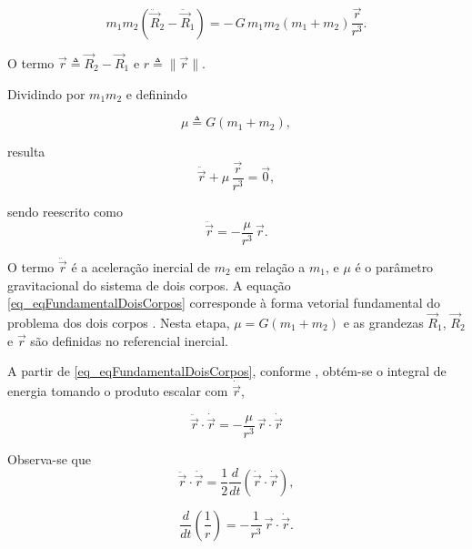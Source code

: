 \begin{equation}
m_1 m_2\left(\ddot{\vec R}_2-\ddot{\vec R}_1\right)
=
-\,G\,m_1 m_2\left(m_1+m_2\right)\frac{\vec r}{r^3}.
\end{equation}

O termo $\vec r\triangleq \vec R_2-\vec R_1$ e $r\triangleq\|\vec r\|$.

Dividindo por $m_1 m_2$ e definindo

\begin{equation}
\mu \triangleq G(m_1+m_2),
\end{equation}

resulta
\begin{equation}
\label{eq_eqFundamentalDoisCorpos1}
\ddot{\vec{r}} + \mu\,\frac{\vec{r}}{r^3} = \vec 0,
\end{equation}

sendo reescrito como
\begin{equation}
\label{eq_eqFundamentalDoisCorpos}
\ddot{\vec r} = -\frac{\mu}{r^3}\,\vec r.
\end{equation}

O termo $\ddot{\vec r}$ é a aceleração inercial de $m_2$ em relação a $m_1$, e $\mu$ é o parâmetro gravitacional do sistema de dois corpos.
A equação \eqref{eq_eqFundamentalDoisCorpos} corresponde à forma vetorial fundamental do problema dos dois corpos \cite{wie2008space}.
Nesta etapa, $\mu=G(m_1+m_2)$ e as grandezas $\vec R_1$, $\vec R_2$ e $\vec r$ são definidas no referencial inercial.

A partir de \eqref{eq_eqFundamentalDoisCorpos}, conforme \cite{wie2008space}, obtém-se o integral de energia tomando o produto escalar com $\dot{\vec r}$,

\begin{equation}
\ddot{\vec r}\cdot \dot{\vec r}
=
-\frac{\mu}{r^3}\,\vec r\cdot \dot{\vec r}
\label{eq_energia_dot_1}
\end{equation}

Observa-se que
\begin{equation}
\ddot{\vec r}\cdot \dot{\vec r}
=
\frac{1}{2}\frac{d}{dt}\!\left(\dot{\vec r}\cdot \dot{\vec r}\right),
\label{eq_identidade_ddotr_dotr}
\end{equation}

\begin{equation}
\frac{d}{dt}\!\left(\frac{1}{r}\right)
=
-\frac{1}{r^3}\,\vec r\cdot \dot{\vec r}.
\label{eq_identidade_d1sobrer}
\end{equation}

